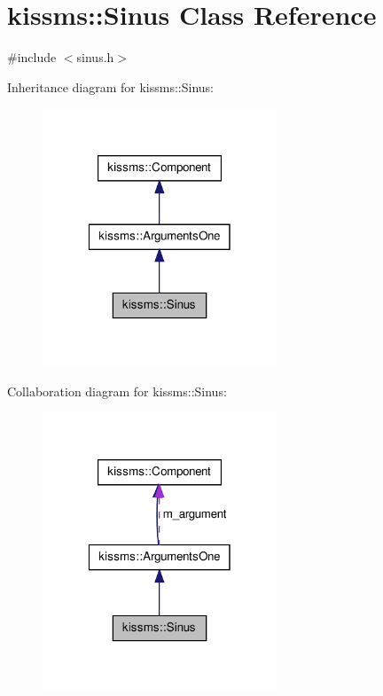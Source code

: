 \hypertarget{classkissms_1_1_sinus}{\section{kissms\-:\-:Sinus Class Reference}
\label{classkissms_1_1_sinus}
}


{\ttfamily \#include $<$sinus.\-h$>$}



Inheritance diagram for kissms\-:\-:Sinus\-:
\nopagebreak
\begin{figure}[H]
\begin{center}
\leavevmode
\includegraphics[width=198pt]{classkissms_1_1_sinus__inherit__graph}
\end{center}
\end{figure}


Collaboration diagram for kissms\-:\-:Sinus\-:
\nopagebreak
\begin{figure}[H]
\begin{center}
\leavevmode
\includegraphics[width=198pt]{classkissms_1_1_sinus__coll__graph}
\end{center}
\end{figure}
